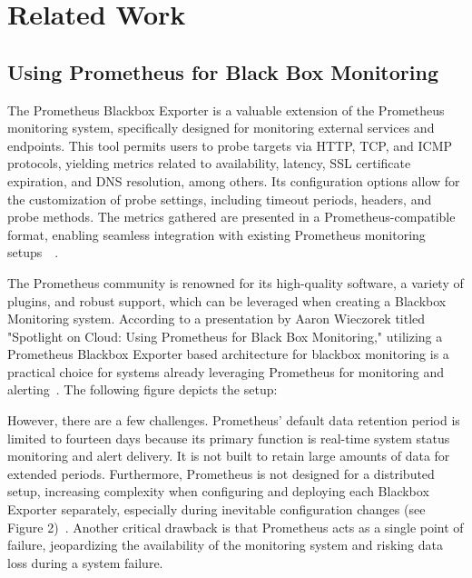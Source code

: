 
\chapter{Related Work}\label{chapter:related_work}

\section{Using Prometheus for Black Box Monitoring}

The Prometheus Blackbox Exporter is a valuable extension of the Prometheus monitoring system, specifically designed for monitoring external services and endpoints. This tool permits users to probe targets via HTTP, TCP, and ICMP protocols, yielding metrics related to availability, latency, SSL certificate expiration, and DNS resolution, among others. Its configuration options allow for the customization of probe settings, including timeout periods, headers, and probe methods. The metrics gathered are presented in a Prometheus-compatible format, enabling seamless integration with existing Prometheus monitoring setups~\parencite{prometheus_overview_nodate}~\parencite{prometheus_blackbox_2023}. 

The Prometheus community is renowned for its high-quality software, a variety of plugins, and robust support, which can be leveraged when creating a Blackbox Monitoring system. According to a presentation by Aaron Wieczorek titled "Spotlight on Cloud: Using Prometheus for Black Box Monitoring," utilizing a Prometheus Blackbox Exporter based architecture for blackbox monitoring is a practical choice for systems already leveraging Prometheus for monitoring and alerting~\parencite{oreilly_spotlight_nodate}. The following figure depicts the setup: 

However, there are a few challenges. Prometheus' default data retention period is limited to fourteen days because its primary function is real-time system status monitoring and alert delivery. It is not built to retain large amounts of data for extended periods. Furthermore, Prometheus is not designed for a distributed setup, increasing complexity when configuring and deploying each Blackbox Exporter separately, especially during inevitable configuration changes (see Figure 2)~\parencite{prometheus_overview_nodate}. Another critical drawback is that Prometheus acts as a single point of failure, jeopardizing the availability of the monitoring system and risking data loss during a system failure. 

